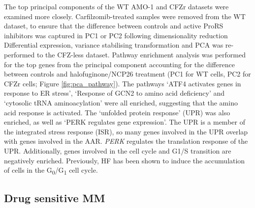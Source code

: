 The top principal components of the WT AMO-1 and CFZr datasets were examined more closely.
Carfilzomib-treated samples were removed from the WT dataset, to ensure that the difference between controls and active ProRS inhibitors was captured in PC1 or PC2 following dimensionality reduction
Differential expression, variance stabilising transformation and PCA was re-performed to the CFZ-less dataset.
Pathway enrichment analysis was performed for the top genes from the principal component accounting for the difference between controls and halofuginone/NCP26 treatment (PC1 for WT cells, PC2 for CFZr cells; Figure \ref{fig:pca_pathway}).
The pathways `ATF4 activates genes in response to ER stress', `Response of GCN2 to amino acid deficiency' and `cytosolic tRNA aminoacylation' were all enriched, suggesting that the amino acid response is activated.
The `unfolded protein response' (UPR) was also enriched, as well as `PERK regulates gene expression'.
The UPR is a member of the integrated stress response (ISR), so many genes involved in the UPR overlap with genes involved in the AAR\@.
\textit{PERK} regulates the translation response of the UPR\@.
Additionally, genes involved in the cell cycle and G1/S transition are negatively enriched.
Previously, HF has been shown to induce the accumulation of cells in the G\textsubscript{0}/G\textsubscript{1} cell cycle\cite{leiba2012halofuginone}.

\subsection{Drug sensitive MM}

